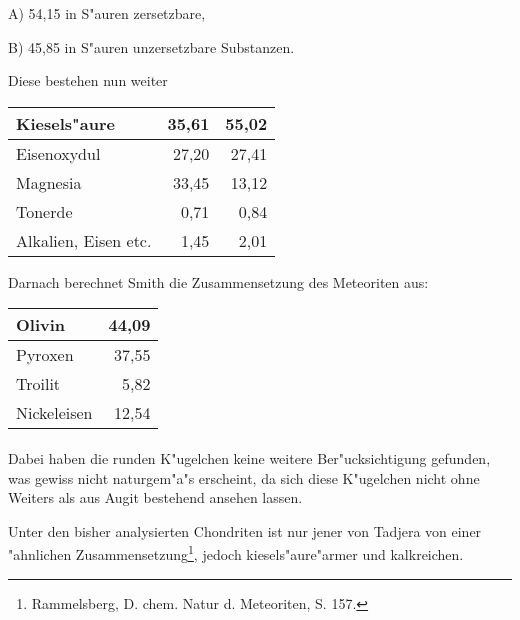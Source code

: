 \documentclass[a4paper, 11pt, oneside]{article}
\begin{document}
A) 54,15 in S"auren zersetzbare,

B) 45,85 in S"auren unzersetzbare Substanzen.

Diese bestehen nun weiter
\begin{center}
    \begin{tabular}{ |l|r|r| } 
    \hline
    Kiesels"aure & 35,61 & 55,02\\\hline
    Eisenoxydul & 27,20 & 27,41\\\hline
    Magnesia & 33,45 & 13,12\\\hline
    Tonerde & 0,71 & 0,84\\\hline
    Alkalien, Eisen etc. & 1,45 & 2,01\\
    \hline
    \end{tabular}
\end{center}
Darnach berechnet Smith die Zusammensetzung des Meteoriten aus:
\begin{center}
    \begin{tabular}{ |l|r| } 
    \hline
    Olivin & 44,09\\\hline
    Pyroxen & 37,55\\\hline
    Troilit & 5,82\\\hline
    Nickeleisen & 12,54\\
    \hline
    \end{tabular}
\end{center}
\paragraph{}
Dabei haben die runden K"ugelchen keine weitere Ber"ucksichtigung gefunden, was gewiss nicht naturgem"a"s erscheint, da sich diese K"ugelchen nicht ohne Weiters als aus Augit bestehend ansehen lassen.

Unter den bisher analysierten Chondriten ist nur jener von Tadjera von einer "ahnlichen Zusammensetzung\footnote{Rammelsberg, D. chem. Natur d. Meteoriten, S. 157.}, jedoch kiesels"aure"armer und kalkreichen.
\end{document}

